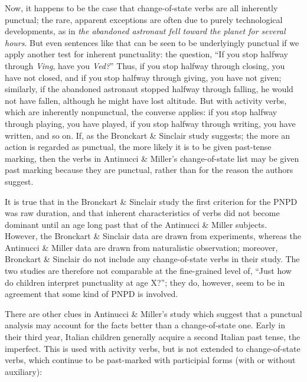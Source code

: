 Now, it happens to be the case that change-of-state verbs are all inherently punctual; the rare, apparent exceptions are often due to purely technological developments, as in \textit{the abandoned astronaut fell toward the planet for several hours}. But even sentences like that can be seen to be underlyingly punctual if we apply another test for inherent punctuality: the question, ``If you stop halfway through \textit{Ving}, have you \textit{Ved?}'' Thus, if you stop halfway through closing, you have not closed, and if you stop halfway through giving, you have not given; similarly, if the abandoned astronaut stopped halfway through falling, he would not have fallen, although he might have lost altitude. But with activity verbs, which are inherently nonpunctual, the converse applies: if you stop halfway through playing, you have played, if you stop halfway through writing, you have written, and so on. If, as the Bronckart \& Sinclair study suggests; the more an action is regarded as punctual, the more likely it is to be given past-tense marking, then the verbs in Antinucci \& Miller's change-of-state list may be given past marking because they are punctual, rather than for the reason the authors suggest.

It is true that in the Bronckart \& Sinclair study the first criterion for the PNPD was raw duration, and that inherent characteristics of verbs did not become dominant until an age long past that of the Antinucci \& Miller subjects. However, the Bronckart \& Sinclair data are drawn from experiments, whereas the Antinucci \& Miller data are drawn from naturalistic observation; moreover, Bronckart \& Sinclair do not include any change-of-state verbs in their study. The two studies are therefore not comparable at the fine-grained level of, ``Just how do children interpret punctuality at age X?''; they do, however, seem to be in agreement that some kind of PNPD is involved.

There are other clues in Antinucci \& Miller's study which 
suggest that a punctual analysis may account for the facts better than a change-of-state one. Early in their third year, Italian children generally acquire a second Italian past tense, the imperfect. This is used with activity verbs, but is not extended to change-of-state verbs, which continue to be past-marked with participial forms (with or without auxiliary):


